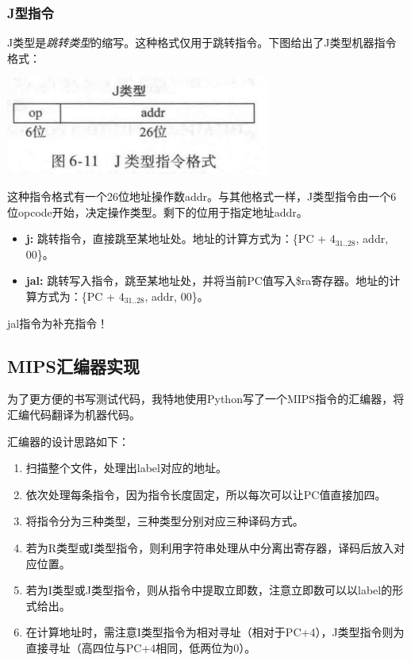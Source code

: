 \documentclass[twocolumn]{article} %
\begin{document}
\begin{sloppypar}
\subsubsection{J型指令}

J类型是{\em 跳转类型}的缩写。这种格式仅用于跳转指令。下图给出了J类型机器指令格式：

\includegraphics[width =0.9 \linewidth]{figure/Jtype.png}

这种指令格式有一个26位地址操作数addr。与其他格式一样，J类型指令由一个6位opcode开始，决定操作类型。剩下的位用于指定地址addr。

\begin{itemize}
\item {\bf j:} 跳转指令，直接跳至某地址处。地址的计算方式为：\{PC + $\textit{4}_{31..28}$, addr, 00\}。
\item {\bf jal:} 跳转写入指令，跳至某地址处，并将当前PC值写入\$ra寄存器。地址的计算方式为：\{PC + $\textit{4}_{31..28}$, addr, 00\}。
\end{itemize}

{\color{red} jal指令为补充指令！}

\subsection{{\color{red} MIPS汇编器实现}}

为了更方便的书写测试代码，我特地使用Python写了一个MIPS指令的汇编器，将汇编代码翻译为机器代码。

汇编器的设计思路如下：
\begin{enumerate}
\item 扫描整个文件，处理出label对应的地址。
\item 依次处理每条指令，因为指令长度固定，所以每次可以让PC值直接加四。
\item 将指令分为三种类型，三种类型分别对应三种译码方式。
\item 若为R类型或I类型指令，则利用字符串处理从中分离出寄存器，译码后放入对应位置。
\item 若为I类型或J类型指令，则从指令中提取立即数，注意立即数可以以label的形式给出。
\item 在计算地址时，需注意I类型指令为相对寻址（相对于PC+4），J类型指令则为直接寻址（高四位与PC+4相同，低两位为0）。
\end{enumerate}


\end{sloppypar}
\end{document}
